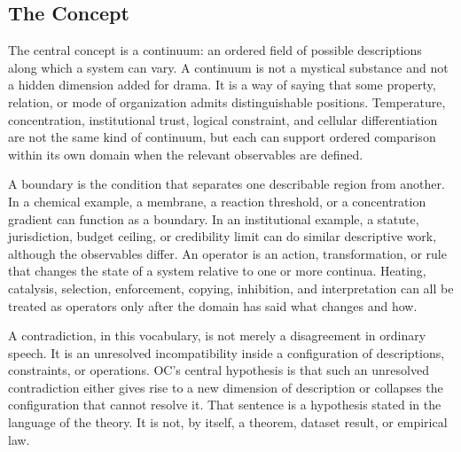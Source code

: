 \documentclass[11pt,a4paper,openany]{book}
\begin{document}
\subsection{The Concept}
The central concept is a continuum: an ordered field of possible descriptions along which a system can vary. A continuum is not a mystical substance and not a hidden dimension added for drama. It is a way of saying that some property, relation, or mode of organization admits distinguishable positions. Temperature, concentration, institutional trust, logical constraint, and cellular differentiation are not the same kind of continuum, but each can support ordered comparison within its own domain when the relevant observables are defined. \cite{nicolis_prigogine_selforg,kauffman_autocatalytic}\par
A boundary is the condition that separates one describable region from another. In a chemical example, a membrane, a reaction threshold, or a concentration gradient can function as a boundary. In an institutional example, a statute, jurisdiction, budget ceiling, or credibility limit can do similar descriptive work, although the observables differ. An operator is an action, transformation, or rule that changes the state of a system relative to one or more continua. Heating, catalysis, selection, enforcement, copying, inhibition, and interpretation can all be treated as operators only after the domain has said what changes and how.\par
A contradiction, in this vocabulary, is not merely a disagreement in ordinary speech. It is an unresolved incompatibility inside a configuration of descriptions, constraints, or operations. OC's central hypothesis is that such an unresolved contradiction either gives rise to a new dimension of description or collapses the configuration that cannot resolve it. That sentence is a hypothesis stated in the language of the theory. It is not, by itself, a theorem, dataset result, or empirical law.\par
\end{document}
